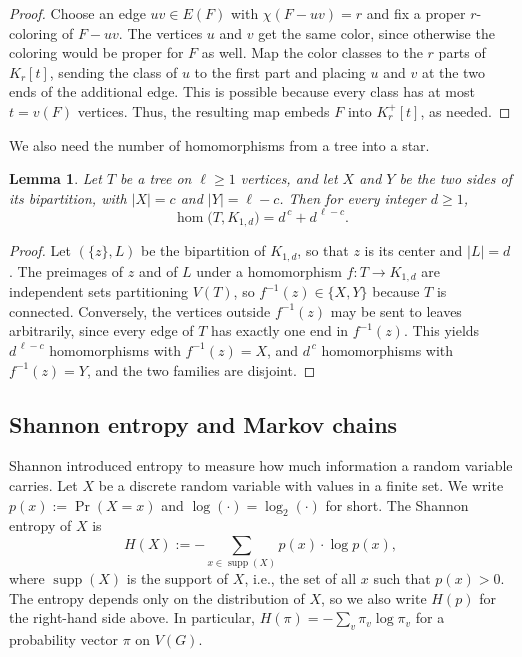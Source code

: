 \documentclass[11pt, a4paper]{article}
\newtheorem{lemma}[theorem]{Lemma}
\theoremstyle{definition}
\theoremstyle{plain}
\renewcommand{\ge}{\geqslant}
\newcommand{\supp}{\operatorname{supp}}
\begin{document}
\begin{proof}
Choose an edge $uv\in E(F)$ with
$\chi (F-uv)=r$ and fix a proper $r$-coloring of
$F-uv$. The vertices $u$ and $v$ get the same
color, since otherwise the coloring would be
proper for $F$ as well. Map the color classes to
the $r$ parts of $K_r[t]$, sending the class of
$u$ to the first part and placing $u$ and $v$ at
the two ends of the additional edge. This is
possible because every class has at most
$t=v(F)$ vertices. Thus, 
the resulting map embeds $F$ into $K_r^+[t]$, as needed. 
\end{proof}

We also need the number of homomorphisms
from a tree into a star. 


\begin{lemma}\label{lem:hom-star}
Let $T$ be a tree on $\ell \ge 1$ vertices, and
let $X$ and $Y$ be the two sides of its
bipartition, with $|X|=c$ and $|Y|=\ell -c$. Then
for every integer $d\ge 1$,
\[
  \hom \bigl(T,K_{1,d}\bigr)=d^{\,c}+d^{\,\ell -c}.
\]
\end{lemma}

\begin{proof}
Let $(\{z\},L)$ be the bipartition of $K_{1,d}$, so that $z$ is its
center and $|L|=d$. The preimages of $z$ and of $L$ under a
homomorphism $f\colon T\to K_{1,d}$ are independent sets partitioning
$V(T)$, so $f^{-1}(z)\in \{X,Y\}$ because $T$ is connected. Conversely, the vertices outside $f^{-1}(z)$ may be sent to leaves arbitrarily, since every edge of $T$ has exactly one end in $f^{-1}(z)$. 
This yields $d^{\,\ell -c}$ homomorphisms with $f^{-1}(z)=X$,  and $d^{\,c}$ homomorphisms with
$f^{-1}(z)=Y$, and the two families are disjoint.
\end{proof} 



\subsection{Shannon entropy and Markov chains}

\label{subsec:entropy-prelim}

Shannon \cite{Shannon1948} introduced entropy to measure how much information a random variable carries.  
Let $X$ be a discrete random variable 
with values in a finite
set. We write $p(x):=\Pr (X=x)$ and $\log (\cdot )= \log_2(\cdot)$ for short. The
Shannon entropy of $X$ is
\[
  H(X):=-\sum_{x\in \supp (X)} p(x) \cdot \log p(x),
\]
where $\supp (X)$ is the support of $X$, i.e., the set of all $x$ such that $p(x)>0$. 
The entropy depends only on the distribution of
$X$, so we also write $H( p )$ for the right-hand side
above. In particular, $H(\pi)=-\sum_v\pi_v\log \pi_v$
for a probability vector $\pi$ on $V(G)$.
\end{document}
